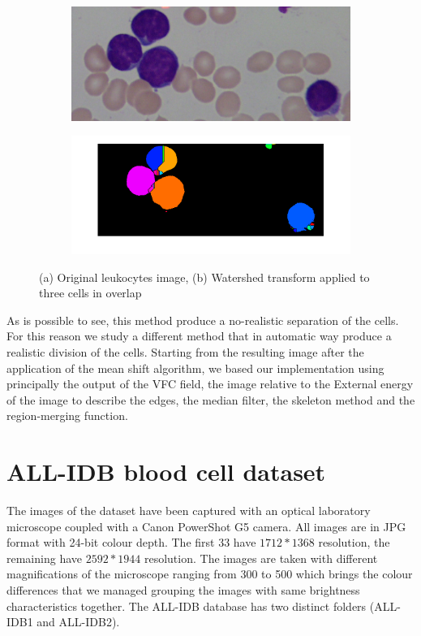 \begin{figure}
	\centering
	\begin{subfigure}[b]{0.5\textwidth}
        \includegraphics[width=\textwidth]{img/Im007_1_crop.png}
        \caption{ }
        \label{fig:origimage}
    \end{subfigure}
    \begin{subfigure}[b]{0.5\textwidth}
		\includegraphics[width=\textwidth]{img/waterTrRes.png}
		\caption{ }
		\label{fig:watershedoncells}
	\end{subfigure}
	\caption{(a) Original leukocytes image, (b) Watershed transform applied to three cells in overlap}
	\label{fig:exOnImage7}
\end{figure}
As is possible to see, this method produce a no-realistic separation of the cells. For this reason we study a different method that in automatic way produce a realistic division of the cells. Starting from the resulting image after the application of the mean shift algorithm, we based our implementation using principally the output of the VFC field, the image relative to the External energy of the image to describe the edges, the median filter, the skeleton method and the region-merging function.
\section{ALL-IDB blood cell dataset}
The images of the dataset have been captured with an optical laboratory microscope coupled with
a Canon PowerShot G5 camera. All images are in JPG format with 24-bit colour depth. The first 33
have $1712*1368$ resolution, the remaining have $2592*1944$ resolution. The images are taken with
different magnifications of the microscope ranging from 300 to 500 which brings the colour
differences that we managed grouping the images with same brightness characteristics together. The
ALL-IDB database has two distinct folders (ALL-IDB1 and ALL-IDB2).

